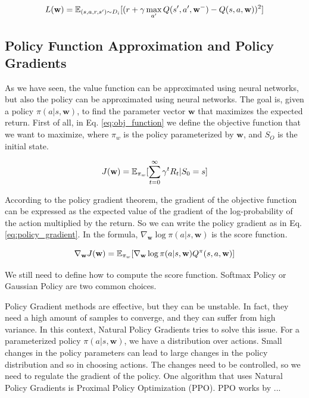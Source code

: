 \begin{equation} \label{eq:dqn_loss}
    L(\textbf{w}) = \operatorname{\mathbb{E}}_{(s, a, r, s') \sim D_i} [(r + \gamma \max_{a'} Q(s', a', \textbf{w}^-) - Q(s, a, \textbf{w}))^2]
\end{equation}




\subsection{Policy Function Approximation and Policy Gradients}\label{subsec:policy_function_approximation_and_policy_gradients}
As we have seen, the value function can be approximated using neural networks, but also the policy can be approximated using neural networks.
The goal is, given a policy $\pi(a|s, \textbf{w})$, to find the parameter vector $\textbf{w}$ that maximizes the expected return.
First of all, in Eq. \ref{eq:obj_function} we define the objective function that we want to maximize, where $\pi_w$ is the policy parameterized by $\textbf{w}$, and $S_O$ is the initial state.

\begin{equation} \label{eq:obj_function}
    J(\textbf{w}) = \operatorname{\mathbb{E}}_{\pi_w}[\sum_{t=0}^{\infty} \gamma^t R_t | S_0 = s]
\end{equation}

According to the policy gradient theorem, the gradient of the objective function can be expressed as the expected value of the gradient of the log-probability of the action multiplied by the return.
So we can write the policy gradient as in Eq. \ref{eq:policy_gradient}.
In the formula, $\nabla_{\textbf{w}} \log \pi(a|s, \textbf{w})$ is the score function.

\begin{equation} \label{eq:policy_gradient}
    \nabla_{\textbf{w}} J(\textbf{w}) = \operatorname{\mathbb{E}}_{\pi_w}[\nabla_{\textbf{w}} \log \pi(a|s, \textbf{w}) Q^{\pi}(s, a, \textbf{w})]
\end{equation}


We still need to define how to compute the score function.
Softmax Policy or Gaussian Policy are two common choices.

Policy Gradient methods are effective, but they can be unstable.
In fact, they need a high amount of samples to converge, and they can suffer from high variance.
In this context, Natural Policy Gradients tries to solve this issue.
For a parameterized policy $\pi(a|s, \textbf{w})$, we have a distribution over actions.
Small changes in the policy parameters can lead to large changes in the policy distribution and so in choosing actions.
The changes need to be controlled, so we need to regulate the gradient of the policy.
One algorithm that uses Natural Policy Gradients is Proximal Policy Optimization (PPO).
PPO works by ...




